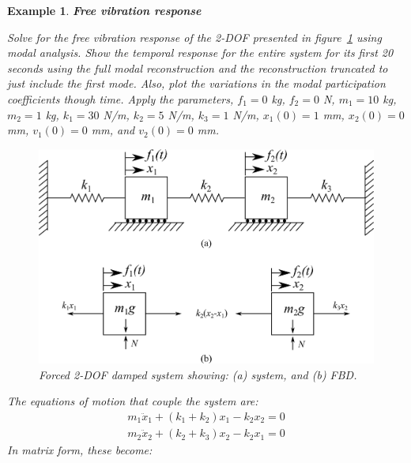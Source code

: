 \documentclass[12pt,letter]{article}
\newtheorem{ex}{Example}
\numberwithin{ex}{section} %
\newenvironment{example}{\begin{mdframed}[middlelinewidth=0.5mm]\begin{ex}\normalfont}{\end{ex}\end{mdframed}}
\numberwithin{re}{section} %
\begin{document}
\begin{example}
\textbf{Free vibration response}

Solve for the free vibration response of the 2-DOF presented in figure~\ref{fig:2-DOF-spring_mass_horizontal_double_wall} using modal analysis. Show the temporal response for the entire system for its first 20 seconds using the full modal reconstruction and the reconstruction truncated to just include the first mode. Also, plot the variations in the modal participation coefficients though time. Apply the parameters, $f_1 = 0$ kg, $f_2 = 0$ N, $m_1 = 10$ kg, $m_2 = 1$ kg, $k_1 = 30$ N/m, $k_2 = 5$ N/m, $k_3 = 1$ N/m, $x_1(0) = 1$ mm, $x_2(0) = 0$ mm, $v_1(0) = 0$ mm, and $v_2(0) = 0$ mm.

\begin{figure}[H]
	\centering
	\includegraphics[]{../Figures/2-DOF-spring_mass_horizontal_double_wall.png}
	\caption{Forced 2-DOF damped system showing: (a) system, and (b) FBD.}
	\label{fig:2-DOF-spring_mass_horizontal_double_wall}
\end{figure}


The equations of motion that couple the system are:
\begin{eqnarray}
m_1\ddot{x}_1 + (k_1+k_2)x_1 - k_2x_2 = 0 \\
m_2\ddot{x}_2 + (k_2+k_3)x_2 - k_2x_1 = 0 \nonumber
\end{eqnarray}
In matrix form, these become:


\end{example}
\end{document}
